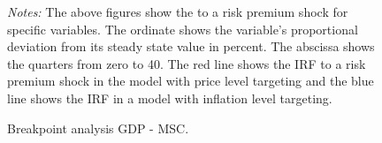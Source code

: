 \documentclass[11pt, a4paper, leqno]{article}
\begin{document}
\begin{figure}[ht!]
	\caption{Breakpoint analysis GDP - MSC.}
	\label{fig:irf}
	\centering
    	\bigskip
	\begin{minipage}{\textwidth}%
		\footnotesize\setlength{\baselineskip}{11pt}%
		\bigskip \textit{Notes:} The above figures show the  to a risk premium shock for specific variables. The ordinate shows the variable's proportional deviation from its steady state value in percent. The abscissa shows the quarters from zero to 40. The red line shows the IRF to a risk premium shock in the model with price level targeting and the blue line shows the IRF in a model with inflation level targeting.
	\end{minipage}
\end{figure}
\end{document}
